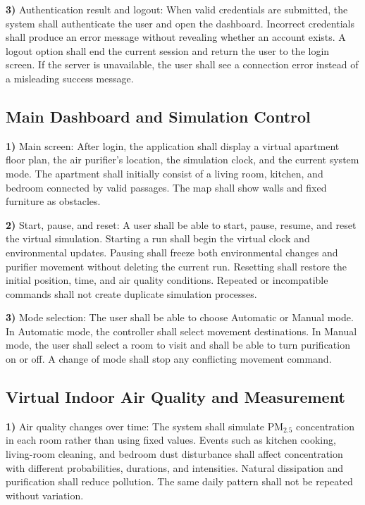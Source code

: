 \documentclass[conference]{IEEEtran}
\begin{document}
\par\noindent\textbf{3)} Authentication result and logout:
When valid credentials are submitted, the system shall authenticate the user and open the dashboard. Incorrect credentials shall produce an error message without revealing whether an account exists. A logout option shall end the current session and return the user to the login screen. If the server is unavailable, the user shall see a connection error instead of a misleading success message.

\subsection{Main Dashboard and Simulation Control}
\par\noindent\textbf{1)} Main screen:
After login, the application shall display a virtual apartment floor plan, the air purifier's location, the simulation clock, and the current system mode. The apartment shall initially consist of a living room, kitchen, and bedroom connected by valid passages. The map shall show walls and fixed furniture as obstacles.

\par\noindent\textbf{2)} Start, pause, and reset:
A user shall be able to start, pause, resume, and reset the virtual simulation. Starting a run shall begin the virtual clock and environmental updates. Pausing shall freeze both environmental changes and purifier movement without deleting the current run. Resetting shall restore the initial position, time, and air quality conditions. Repeated or incompatible commands shall not create duplicate simulation processes.

\par\noindent\textbf{3)} Mode selection:
The user shall be able to choose Automatic or Manual mode. In Automatic mode, the controller shall select movement destinations. In Manual mode, the user shall select a room to visit and shall be able to turn purification on or off. A change of mode shall stop any conflicting movement command.

\subsection{Virtual Indoor Air Quality and Measurement}
\par\noindent\textbf{1)} Air quality changes over time:
The system shall simulate PM$_{2.5}$ concentration in each room rather than using fixed values. Events such as kitchen cooking, living-room cleaning, and bedroom dust disturbance shall affect concentration with different probabilities, durations, and intensities. Natural dissipation and purification shall reduce pollution. The same daily pattern shall not be repeated without variation.
\end{document}
